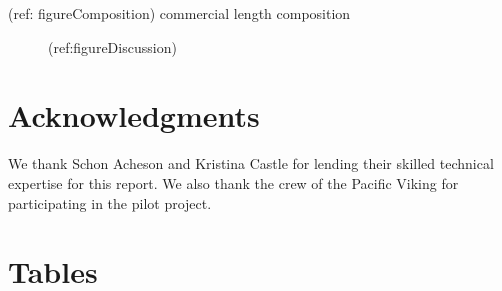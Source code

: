 \documentclass[12pt]{article}\usepackage[]{graphicx}\usepackage[]{color}
\begin{document}
(ref: figureComposition) commercial length composition
\begin{figure}[htb]

 \hfill{}

\caption{(ref:figureDiscussion)}\label{fig:figureComposition}
\end{figure}
\hypertarget{acknowledgments}{%
\section{Acknowledgments}\label{acknowledgments}}

We thank Schon Acheson and Kristina Castle for lending their skilled technical expertise for this report. We also thank the crew of the Pacific Viking for participating in the pilot project.

\clearpage

\hypertarget{tables}{%
\section{Tables}\label{tables}}
\end{document}
